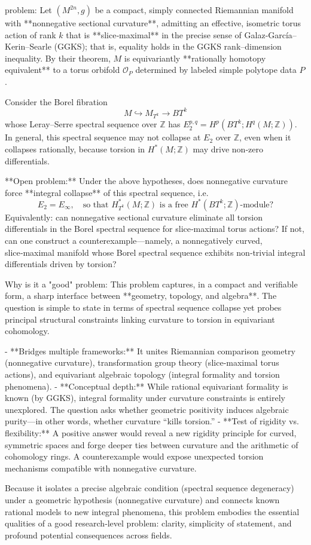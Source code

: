 problem:  
Let \( (M^{2n}, g) \) be a compact, simply connected Riemannian manifold with **nonnegative sectional curvature**, admitting an effective, isometric torus action of rank \(k\) that is **slice‑maximal** in the precise sense of Galaz‑García–Kerin–Searle (GGKS); that is, equality holds in the GGKS rank–dimension inequality.  
By their theorem, \(M\) is equivariantly **rationally homotopy equivalent** to a torus orbifold \(\mathcal{O}_P\) determined by labeled simple polytope data \(P\).

Consider the Borel fibration  
\[
M \hookrightarrow M_{T^k} \to BT^k
\]
whose Leray–Serre spectral sequence over \(\mathbb Z\) has \(E_2^{p,q} = H^p(BT^k; H^q(M;\mathbb Z))\).  
In general, this spectral sequence may not collapse at \(E_2\) over \(\mathbb Z\), even when it collapses rationally, because torsion in \(H^*(M;\mathbb Z)\) may drive non‑zero differentials.  

**Open problem:**  
Under the above hypotheses, does nonnegative curvature force **integral collapse** of this spectral sequence, i.e.  
\[
E_2 = E_\infty, \quad \text{so that } H^*_{T^k}(M;\mathbb Z) \text{ is a free } H^*(BT^k;\mathbb Z)\text{‑module}?
\]  
Equivalently: can nonnegative sectional curvature eliminate all torsion differentials in the Borel spectral sequence for slice‑maximal torus actions?  
If not, can one construct a counterexample—namely, a nonnegatively curved, slice‑maximal manifold whose Borel spectral sequence exhibits non‑trivial integral differentials driven by torsion?

Why is it a "good" problem:  
This problem captures, in a compact and verifiable form, a sharp interface between **geometry, topology, and algebra**. The question is simple to state in terms of spectral sequence collapse yet probes principal structural constraints linking curvature to torsion in equivariant cohomology.  

- **Bridges multiple frameworks:** It unites Riemannian comparison geometry (nonnegative curvature), transformation group theory (slice‑maximal torus actions), and equivariant algebraic topology (integral formality and torsion phenomena).  
- **Conceptual depth:** While rational equivariant formality is known (by GGKS), integral formality under curvature constraints is entirely unexplored. The question asks whether geometric positivity induces algebraic purity—in other words, whether curvature “kills torsion.”  
- **Test of rigidity vs. flexibility:** A positive answer would reveal a new rigidity principle for curved, symmetric spaces and forge deeper ties between curvature and the arithmetic of cohomology rings. A counterexample would expose unexpected torsion mechanisms compatible with nonnegative curvature.  

Because it isolates a precise algebraic condition (spectral sequence degeneracy) under a geometric hypothesis (nonnegative curvature) and connects known rational models to new integral phenomena, this problem embodies the essential qualities of a good research‑level problem: clarity, simplicity of statement, and profound potential consequences across fields.